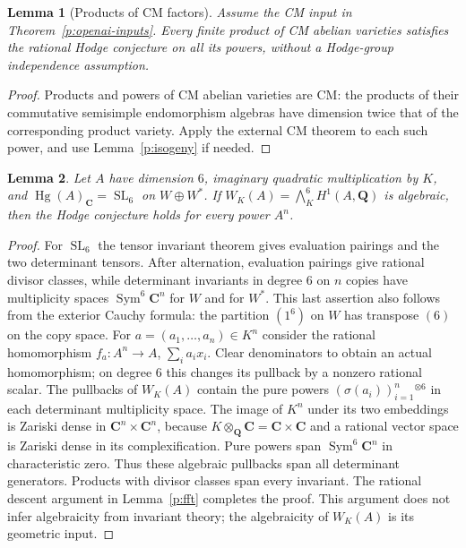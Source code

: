 \documentclass[11pt,reqno]{article}
\theoremstyle{emphasizedplain}
\theoremstyle{emphasizeddefinition}
\theoremstyle{emphasizeddefinition}
\newtheorem{prelemma}{Lemma}
\DeclareMathOperator{\Hg}{Hg}
\DeclareMathOperator{\SL}{SL}
\DeclareMathOperator{\Sym}{Sym}
\newcommand{\Q}{\mathbf Q}
\newcommand{\C}{\mathbf C}
\begin{document}
\begin{prelemma}[Products of CM factors]\label{p:CMproducts-new}
Assume the CM input in Theorem~\ref{p:openai-inputs}. Every finite
product of CM abelian varieties satisfies the rational Hodge conjecture
on all its powers, without a Hodge-group independence assumption.
\end{prelemma}
\begin{proof}
Products and powers of CM abelian varieties are CM: the products of
their commutative semisimple endomorphism algebras have dimension
twice that of the corresponding product variety. Apply the external
CM theorem to each such power, and use Lemma~\ref{p:isogeny} if needed.
\end{proof}

\begin{prelemma}\label{p:polarization}
Let $A$ have dimension $6$, imaginary quadratic multiplication by $K$, and
$\Hg(A)_\C=\SL_6$ on $W\oplus W^*$. If
$W_K(A)=\bigwedge_K^6 H^1(A,\Q)$ is algebraic, then the Hodge conjecture
holds for every power $A^n$.
\end{prelemma}
\begin{proof}
For $\SL_6$ the tensor invariant theorem gives evaluation pairings and the
two determinant tensors. After alternation, evaluation pairings give
rational divisor classes, while determinant invariants in degree $6$ on
$n$ copies have multiplicity spaces $\Sym^6\C^n$ for $W$ and for $W^*$.
This last assertion also follows from the exterior Cauchy formula: the
partition $(1^6)$ on $W$ has transpose $(6)$ on the copy space.
For $a=(a_1,\ldots,a_n)\in K^n$ consider the rational homomorphism
$f_a:A^n\to A$, $\sum_i a_i x_i$. Clear denominators to obtain an actual
homomorphism; on degree $6$ this changes its pullback by a nonzero rational
scalar. The pullbacks of $W_K(A)$ contain the pure powers
$(\sigma(a_i))_{i=1}^n{}^{\otimes6}$ in each determinant multiplicity space.
The image of $K^n$ under its two embeddings is Zariski dense in
$\C^n\times\C^n$, because $K\otimes_\Q\C=\C\times\C$ and a rational
vector space is Zariski dense in its complexification. Pure powers span
$\Sym^6\C^n$ in characteristic zero. Thus these algebraic pullbacks span
all determinant generators. Products with divisor classes span every
invariant. The rational descent argument in Lemma~\ref{p:fft} completes the
proof. This argument does not infer algebraicity from invariant theory;
the algebraicity of $W_K(A)$ is its geometric input.
\end{proof}
\end{document}
